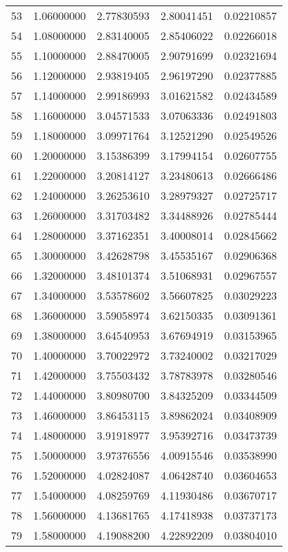 \begin{tabular}{lrrrr}
53 & 1.06000000 & 2.77830593 & 2.80041451 & 0.02210857 \\
54 & 1.08000000 & 2.83140005 & 2.85406022 & 0.02266018 \\
55 & 1.10000000 & 2.88470005 & 2.90791699 & 0.02321694 \\
56 & 1.12000000 & 2.93819405 & 2.96197290 & 0.02377885 \\
57 & 1.14000000 & 2.99186993 & 3.01621582 & 0.02434589 \\
58 & 1.16000000 & 3.04571533 & 3.07063336 & 0.02491803 \\
59 & 1.18000000 & 3.09971764 & 3.12521290 & 0.02549526 \\
60 & 1.20000000 & 3.15386399 & 3.17994154 & 0.02607755 \\
61 & 1.22000000 & 3.20814127 & 3.23480613 & 0.02666486 \\
62 & 1.24000000 & 3.26253610 & 3.28979327 & 0.02725717 \\
63 & 1.26000000 & 3.31703482 & 3.34488926 & 0.02785444 \\
64 & 1.28000000 & 3.37162351 & 3.40008014 & 0.02845662 \\
65 & 1.30000000 & 3.42628798 & 3.45535167 & 0.02906368 \\
66 & 1.32000000 & 3.48101374 & 3.51068931 & 0.02967557 \\
67 & 1.34000000 & 3.53578602 & 3.56607825 & 0.03029223 \\
68 & 1.36000000 & 3.59058974 & 3.62150335 & 0.03091361 \\
69 & 1.38000000 & 3.64540953 & 3.67694919 & 0.03153965 \\
70 & 1.40000000 & 3.70022972 & 3.73240002 & 0.03217029 \\
71 & 1.42000000 & 3.75503432 & 3.78783978 & 0.03280546 \\
72 & 1.44000000 & 3.80980700 & 3.84325209 & 0.03344509 \\
73 & 1.46000000 & 3.86453115 & 3.89862024 & 0.03408909 \\
74 & 1.48000000 & 3.91918977 & 3.95392716 & 0.03473739 \\
75 & 1.50000000 & 3.97376556 & 4.00915546 & 0.03538990 \\
76 & 1.52000000 & 4.02824087 & 4.06428740 & 0.03604653 \\
77 & 1.54000000 & 4.08259769 & 4.11930486 & 0.03670717 \\
78 & 1.56000000 & 4.13681765 & 4.17418938 & 0.03737173 \\
79 & 1.58000000 & 4.19088200 & 4.22892209 & 0.03804010 \\

\end{tabular}
